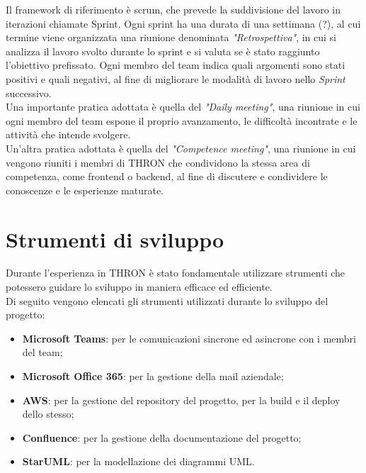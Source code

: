 Il \glsfirstoccur\gls{framework} di riferimento è \glsfirstoccur\gls{scrum}, che prevede la suddivisione del
lavoro in iterazioni chiamate \glsfirstoccur\gls{Sprint}. Ogni sprint ha una durata di una
settimana (?), al cui termine viene organizzata una riunione denominata
\emph{"Retrospettiva"}, in cui si analizza il lavoro svolto durante lo sprint
e si valuta se è stato raggiunto l'obiettivo prefissato. Ogni
membro del team indica quali argomenti sono stati positivi e quali
negativi, al fine di migliorare le modalità di lavoro nello
\emph{Sprint} successivo.\\
Una importante pratica adottata è quella del \emph{"Daily
      meeting"}, una riunione in cui ogni membro del team espone il proprio
avanzamento, le difficoltà incontrate e le attività che intende svolgere. \\
Un'altra pratica adottata è quella del \emph{"Competence meeting"}, una riunione
in cui vengono riuniti i membri di THRON che condividono la stessa area di
competenza, come \glsfirstoccur\gls{frontend} o \glsfirstoccur\gls{backend}, al
fine di discutere e condividere le conoscenze e le esperienze maturate.\\

\section{Strumenti di sviluppo}
Durante l'esperienza in THRON è stato fondamentale utilizzare strumenti che
potessero guidare lo sviluppo in maniera efficace ed efficiente.\\
Di seguito vengono elencati gli strumenti utilizzati durante lo sviluppo del
progetto:
\begin{itemize}
      \item \textbf{Microsoft Teams}: per le comunicazioni sincrone ed asincrone
            con i membri del team;
      \item \textbf{Microsoft Office 365}: per la gestione della mail aziendale;
      \item \textbf{\glsfirstoccur\gls{AWS}}: per la gestione del \glsfirstoccur\gls{repository} del
            progetto, per la \glsfirstoccur\gls{build} e il \glsfirstoccur\gls{deploy}
            dello stesso;
      \item \textbf{Confluence}: per la gestione della documentazione del progetto;
      \item \textbf{StarUML}: per la modellazione dei diagrammi \glsfirstoccur\gls{UML}.
\end{itemize}


